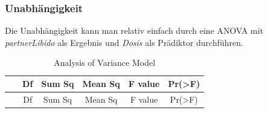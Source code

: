 \documentclass[]{article}
\begin{document}
\subsubsection*{Unabhängigkeit}\label{unabhangigkeit}

Die Unabhängigkeit kann man relativ einfach durch eine ANOVA mit
\emph{partnerLibido} als Ergebnis und \emph{Dosis} als Prädiktor
durchführen.

\begin{longtable}[]{@{}cccccc@{}}
\caption{Analysis of Variance Model}\tabularnewline
\toprule
\begin{minipage}[b]{0.19\columnwidth}\centering\strut
~\strut
\end{minipage} & \begin{minipage}[b]{0.06\columnwidth}\centering\strut
Df\strut
\end{minipage} & \begin{minipage}[b]{0.10\columnwidth}\centering\strut
Sum Sq\strut
\end{minipage} & \begin{minipage}[b]{0.12\columnwidth}\centering\strut
Mean Sq\strut
\end{minipage} & \begin{minipage}[b]{0.12\columnwidth}\centering\strut
F value\strut
\end{minipage} & \begin{minipage}[b]{0.12\columnwidth}\centering\strut
Pr(\textgreater{}F)\strut
\end{minipage}\tabularnewline
\midrule
\endfirsthead
\toprule
\begin{minipage}[b]{0.19\columnwidth}\centering\strut
~\strut
\end{minipage} & \begin{minipage}[b]{0.06\columnwidth}\centering\strut
Df\strut
\end{minipage} & \begin{minipage}[b]{0.10\columnwidth}\centering\strut
Sum Sq\strut
\end{minipage} & \begin{minipage}[b]{0.12\columnwidth}\centering\strut
Mean Sq\strut
\end{minipage} & \begin{minipage}[b]{0.12\columnwidth}\centering\strut
F value\strut
\end{minipage} & \begin{minipage}[b]{0.12\columnwidth}\centering\strut
Pr(\textgreater{}F)\strut
\end{minipage}\tabularnewline

\end{longtable}
\end{document}
